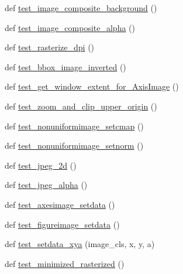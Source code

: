 \begin{DoxyCompactItemize}
\item 
def \hyperlink{namespacematplotlib_1_1tests_1_1test__image_abcf6ca03b9572fc420aea79ca361ebc2}{test\+\_\+image\+\_\+composite\+\_\+background} ()
\item 
def \hyperlink{namespacematplotlib_1_1tests_1_1test__image_adb1c213bc01b368f620182a9dcfcd115}{test\+\_\+image\+\_\+composite\+\_\+alpha} ()
\item 
def \hyperlink{namespacematplotlib_1_1tests_1_1test__image_a6e3a1142a76f7ef332eeff047dad5032}{test\+\_\+rasterize\+\_\+dpi} ()
\item 
def \hyperlink{namespacematplotlib_1_1tests_1_1test__image_a8f73df4d64eef922e7a3fa16b01b6269}{test\+\_\+bbox\+\_\+image\+\_\+inverted} ()
\item 
def \hyperlink{namespacematplotlib_1_1tests_1_1test__image_a2ea73e6b4b211930a657a9559fb0de30}{test\+\_\+get\+\_\+window\+\_\+extent\+\_\+for\+\_\+\+Axis\+Image} ()
\item 
def \hyperlink{namespacematplotlib_1_1tests_1_1test__image_a700f52e02afb989bcd04ed1be2bc205d}{test\+\_\+zoom\+\_\+and\+\_\+clip\+\_\+upper\+\_\+origin} ()
\item 
def \hyperlink{namespacematplotlib_1_1tests_1_1test__image_af73f5a6f55e1fe1ac6fd99a021e1297b}{test\+\_\+nonuniformimage\+\_\+setcmap} ()
\item 
def \hyperlink{namespacematplotlib_1_1tests_1_1test__image_aa8b30e8af896953a75d81b35522cd866}{test\+\_\+nonuniformimage\+\_\+setnorm} ()
\item 
def \hyperlink{namespacematplotlib_1_1tests_1_1test__image_a55ac98abab22e741bebc16c9cc0fbe49}{test\+\_\+jpeg\+\_\+2d} ()
\item 
def \hyperlink{namespacematplotlib_1_1tests_1_1test__image_aa7a25ff82768236458e7745bdaa677a1}{test\+\_\+jpeg\+\_\+alpha} ()
\item 
def \hyperlink{namespacematplotlib_1_1tests_1_1test__image_a133c8e3f50163bece7bd7b0d7d09b656}{test\+\_\+axesimage\+\_\+setdata} ()
\item 
def \hyperlink{namespacematplotlib_1_1tests_1_1test__image_a88f5c36d18e3a7f3d6b3f0f50a5dd673}{test\+\_\+figureimage\+\_\+setdata} ()
\item 
def \hyperlink{namespacematplotlib_1_1tests_1_1test__image_a847fa7763334652c3132087bf3b757c4}{test\+\_\+setdata\+\_\+xya} (image\+\_\+cls, x, y, a)
\item 
def \hyperlink{namespacematplotlib_1_1tests_1_1test__image_a21656dadc2e77d73c95199c81add995e}{test\+\_\+minimized\+\_\+rasterized} ()
\item 

\end{DoxyCompactItemize}
